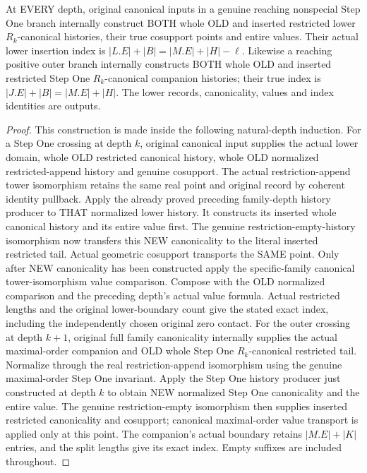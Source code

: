 \begin{theorem}
\label{hir:original-recursive-canonical-crossing-whole-lower-histories}
\leanok
At EVERY depth, original canonical inputs in a genuine reaching nonspecial
Step One branch internally construct BOTH whole OLD and inserted restricted
lower $R_k$-canonical histories, their true cosupport points and entire values.
Their actual lower insertion index is
$|L.E|+|B|=|M.E|+|H|-\ell$. Likewise a reaching positive outer branch internally
constructs BOTH whole OLD and inserted restricted Step One $R_k$-canonical
companion histories; their true index is $|J.E|+|B|=|M.E|+|H|$.
The lower records, canonicality, values and index identities are outputs.
\end{theorem}
\begin{proof}
This construction is made inside the following natural-depth induction.
For a Step One crossing at depth $k$, original canonical input supplies the
actual lower domain, whole OLD restricted canonical history, whole OLD
normalized restricted-append history and genuine cosupport. The actual
restriction-append tower isomorphism retains the same real point and original
record by coherent identity pullback. Apply the already proved preceding
family-depth history producer to THAT normalized lower history. It constructs
its inserted whole canonical history and its entire value first. The genuine
restriction-empty-history isomorphism now transfers this NEW canonicality to
the literal inserted restricted tail. Actual geometric cosupport transports
the SAME point. Only after NEW canonicality has been constructed apply the
specific-family canonical tower-isomorphism value comparison. Compose with
the OLD normalized comparison and the preceding depth's actual value formula.
Actual restricted lengths and the original lower-boundary count give the
stated exact index, including the independently chosen original zero contact.
For the outer crossing at depth $k+1$, original full family canonicality
internally supplies the actual maximal-order companion and OLD whole Step One
$R_k$-canonical restricted tail. Normalize through the real restriction-append
isomorphism using the genuine maximal-order Step One invariant. Apply the
Step One history producer just constructed at depth $k$ to obtain NEW normalized
Step One canonicality and the entire value. The genuine restriction-empty
isomorphism then supplies inserted restricted canonicality and cosupport;
canonical maximal-order value transport is applied only at this point.
The companion's actual boundary retains $|M.E|+|K|$ entries, and the split
lengths give its exact index. Empty suffixes are included throughout.
\end{proof}

